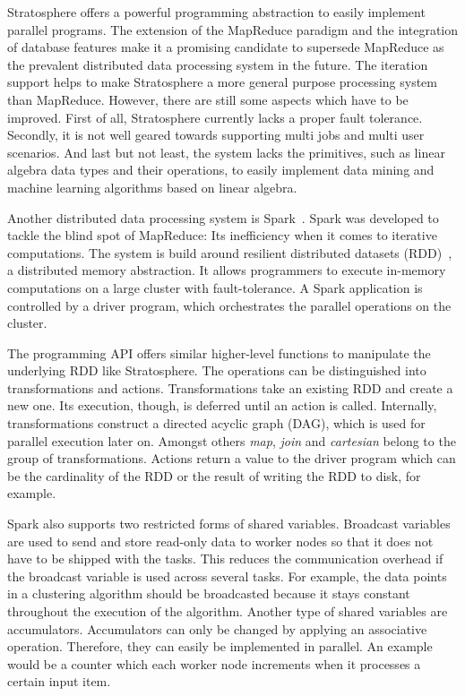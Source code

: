 Stratosphere offers a powerful programming abstraction to easily implement parallel programs.
The extension of the MapReduce paradigm and the integration of database features make it a promising candidate to supersede MapReduce as the prevalent distributed data processing system in the future.
The iteration support helps to make Stratosphere a more general purpose processing system than MapReduce.
However, there are still some aspects which have to be improved.
First of all, Stratosphere currently lacks a proper fault tolerance.
Secondly, it is not well geared towards supporting multi jobs and multi user scenarios.
And last but not least, the system lacks the primitives, such as linear algebra data types and their operations, to easily implement data mining and machine learning algorithms based on linear algebra.

Another distributed data processing system is Spark~\cite{zaharia:2010a}.
Spark was developed to tackle the blind spot of MapReduce: Its inefficiency when it comes to iterative computations.
The system is build around resilient distributed datasets (RDD)~\cite{zaharia:2012a}, a distributed memory abstraction.
It allows programmers to execute in-memory computations on a large cluster with fault-tolerance.
A Spark application is controlled by a driver program, which orchestrates the parallel operations on the cluster.

The programming API offers similar higher-level functions to manipulate the underlying RDD like Stratosphere.
The operations can be distinguished into transformations and actions.
Transformations take an existing RDD and create a new one. 
Its execution, though, is deferred until an action is called.
Internally, transformations construct a directed acyclic graph (DAG), which is used for parallel execution later on.
Amongst others \emph{map}, \emph{join} and \emph{cartesian} belong to the group of transformations.
Actions return a value to the driver program which can be the cardinality of the RDD or the result of writing the RDD to disk, for example.

Spark also supports two restricted forms of shared variables.
Broadcast variables are used to send and store read-only data to worker nodes so that it does not have to be shipped with the tasks.
This reduces the communication overhead if the broadcast variable is used across several tasks.
For example, the data points in a \kmeans clustering algorithm should be broadcasted because it stays constant throughout the execution of the algorithm.
Another type of shared variables are accumulators.
Accumulators can only be changed by applying an associative operation.
Therefore, they can easily be implemented in parallel.
An example would be a counter which each worker node increments when it processes a certain input item.

